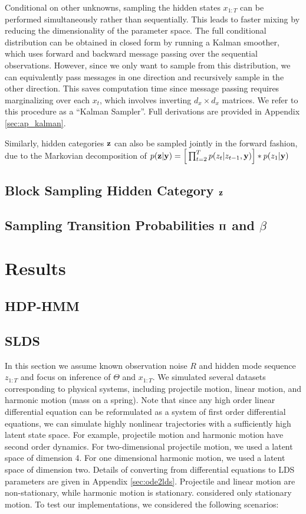 \documentclass{article} %
\begin{document}
Conditional on other unknowns, sampling the hidden states $x_{1:T}$ can be performed simultaneously rather than sequentially. This leads to faster mixing by reducing the dimensionality of the parameter space. The full conditional distribution can be obtained in closed form by running a Kalman smoother, which uses forward and backward message passing over the sequential observations. However, since we only want to sample from this distribution, we can equivalently pass messages in one direction and recursively sample in the other direction. This saves computation time since message passing requires marginalizing over each $x_t$, which involves inverting $d_x\times d_x$ matrices. We refer to this procedure as a ``Kalman Sampler''. Full derivations are provided in Appendix \ref{sec:ap_kalman}.

Similarly, hidden categories ${\bf z}$ can also be sampled jointly in the forward fashion, due to the Markovian decomposition of $p({\bf z} | {\bf y}) = \Big[ \prod_{t=2}^T p(z_t| z_{t-1}, {\bf y}) \Big] * p(z_1|{\bf y})$


\subsection{Block Sampling Hidden Category ${\bf z}$}

\subsection{Sampling Transition Probabilities $\boldsymbol{\Pi}$ and $\beta$}


\section{Results}

\subsection{HDP-HMM}

\subsection{SLDS}

In this section we assume known observation noise $R$ and hidden mode sequence $z_{1:T}$ and focus on inference of $\Theta$ and $x_{1:T}$. We simulated several datasets corresponding to physical systems, including projectile motion, linear motion, and harmonic motion (mass on a spring). Note that since any high order linear differential equation can be reformulated as a system of first order differential equations, we can simulate highly nonlinear trajectories with a sufficiently high latent state space. For example, projectile motion and harmonic motion have second order dynamics. For two-dimensional projectile motion, we used a latent space of dimension 4. For one dimensional harmonic motion, we used a latent space of dimension two. Details of converting from differential equations to LDS parameters are given in Appendix \ref{sec:ode2lds}. Projectile and linear motion are non-stationary, while harmonic motion is stationary. \cite{fox_bayesian_2009} considered only stationary motion. To test our implementations, we considered the following scenarios:
\end{document}
